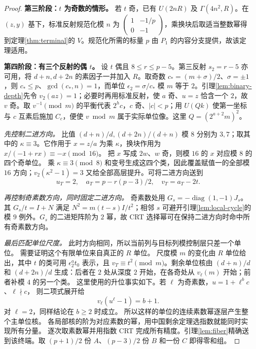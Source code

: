 \documentclass[11pt,a4paper,oneside,openany]{book}
\newcommand{\diag}{\operatorname{diag}}
\theoremstyle{definition}
\numberwithin{equation}{chapter}
\begin{document}
\begin{proof}
\par\noindent\textbf{第三阶段：$t$ 为奇数的情形。}
若 $t$ 奇，已有 $U(2nR)$ 及 $\Gamma(4n^2,R)$。在 $(z,y)$ 基下，标准反射规范化模 $n$ 为 $\left(\begin{smallmatrix}1&-1/p\\0&-1\end{smallmatrix}\right)$，乘换块后取适当整数幂得到定理\ref{thm:terminal}的 $V$。规范化所需的标量 $p$ 由 $P_1$ 的内容分支提供，故该定理适用。


\par\noindent\textbf{第四阶段：有三个反射的偶 $t$。}
设 $t$ 偶且 $8\le r\le p-5$。第三反射 $s_2=r-5$ 亦可用，将 $d+n,d+2n$ 的素因子一并加入 $R$。取奇数 $c_*=(m+\sigma)/2$、$\sigma=\pm1$，则 $c_*\le p$、$\gcd(c_*,n)=1$，而单位 $\epsilon_2=\sigma/c_*$ 模 $m$ 等于 $2$。引理\ref{lem:binary-depth}先令 $v_2(az)=1$；必要时再用标准反射，使 $a$ 奇、$u=z$ 恰含一个 $2$，故 $v$ 奇。取 $v^{-1}\pmod m$ 的平衡代表 $2^h c$，$c$ 奇、$|c|<p$；用 $U(Qk)$ 使第一坐标与 $c$ 互素后施加 $C_c$，便使 $v\bmod m$ 属于实际单位像。这里 $Q=(2^{a+2}m)^2$。

\par\noindent\emph{先控制二进方向。}
比值 $(d+n)/d,(d+2n)/(d+n)$ 模 $8$ 分别为 $3,7$；取其中的 $\kappa\equiv3$。它作用于 $x=z/a$ 为乘 $\kappa$，换块作用为 $x/(-1+rx)\equiv-x\pmod{16}$。
把 $x$ 写成 $2w$、$w$ 奇，则模 $16$ 的 $x$ 对应模 $8$ 的四个奇单位。
乘 $\kappa\equiv3\pmod8$ 和变号生成这四个类，因此覆盖赋值一的全部模 $16$ 方向；$v_2(\kappa^2-1)=3$ 又给全部高层提升。可将二进方向送到
\[
u_T=2,\quad a_T=p-r(p-3)/2,\quad v_T=a_T-2t.
\]

\par\noindent\emph{再控制奇素数方向，同时固定二进方向。}
奇素数处用 $G_s=-\diag(1,-1)J_s$。其 $G_s/t=I+N$ 满足 $N^2=m(t-s)I/t^2$；相邻 $s$ 可避开引理\ref{lem:local-cycle}的模 $9$ 例外。$G_s$ 的二进矩阵阶为 $2$ 幂，故 CRT 选择幂可在保持二进方向时命中所有奇素数方向。

\par\noindent\emph{最后匹配单位尺度。}
此时方向相同，所以当前列与目标列模控制层只差一个单位。
需要证明这个有限单位来自真正的 $R$ 单位。
尺度模 $m$ 的变化由 $R$ 单位给出，其中 $t$ 的类可用 $\epsilon_2^a t_0$ 表示，且 $v_T\equiv t^2\pmod m$。剩余单位核由 $(d+n)/d$ 和 $(d+2n)/d$ 生成：后者在 $2$ 处从深度 $2$ 开始，在各奇处从 $v_\ell(m)$ 开始；前者补模 $4$ 的另一个类。
这里使用的升位事实如下。若 $\ell$ 为奇素数，$u=1+\ell^b c$、$\ell\nmid c$，
则二项式展开给
\[
v_\ell(u^\ell-1)=b+1.
\]
对 $\ell=2$，同样结论在 $b\ge2$ 时成立。
所以这样的单位的连续素数幂逐层产生整个主单位核。
各局部核的阶为对应素数的幂，用中国剩余定理选指数就能同时实现所有分量。
逐次取素数幂并用指数 CRT 完成所有精度。引理\ref{lem:fiber}精确送到该终端。取 $(p+1)/2$ 份 $A$、$(p-3)/2$ 份 $B$ 和一份 $C$ 即得零和组。



\end{proof}
\end{document}
